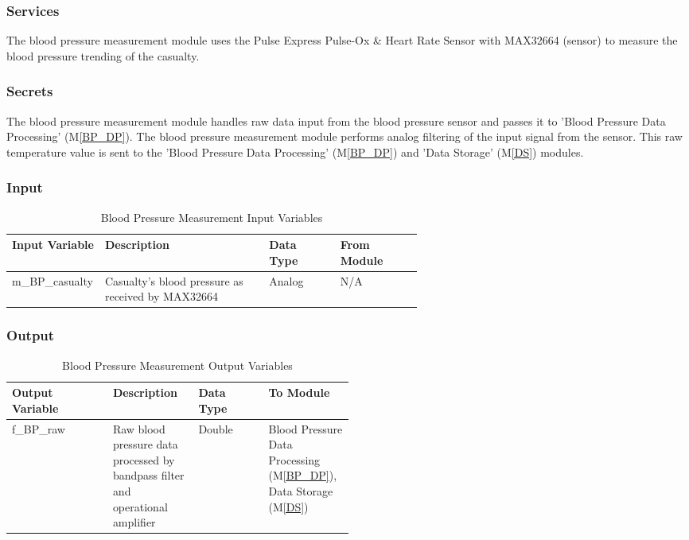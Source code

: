 \documentclass{article}
\begin{document}
\begin{description}
        \subsubsection{Services}
        The blood pressure measurement module uses the Pulse Express Pulse-Ox \& Heart Rate Sensor with MAX32664 (sensor) to measure the blood pressure trending of the casualty.
        \subsubsection{Secrets}
        The blood pressure measurement module handles raw data input from the blood pressure sensor and passes it to 'Blood Pressure Data Processing' (M\ref{BP_DP}). The blood pressure measurement module performs analog filtering of the input signal from the sensor. This raw temperature value is sent to the 'Blood Pressure Data Processing' (M\ref{BP_DP}) and 'Data Storage' (M\ref{DS}) modules.
        \subsubsection{Input}
            \begin{longtable}{|l|p{0.4\linewidth}|l|p{0.2\linewidth}|}
            \caption{Blood Pressure Measurement Input Variables}
            \hline
            \textbf{Input Variable} & \textbf{Description} & \textbf {Data Type} & \textbf{From Module} \\
            \endhead
            \hline
            m\_BP\_casualty & Casualty's blood pressure as received by MAX32664 & Analog & N/A \\
            \hline
            \end{longtable}
        \newpage
        \subsubsection{Output}
            \begin{longtable}{|l|p{0.25\linewidth}|l|p{0.25\linewidth}|}
            \caption{Blood Pressure Measurement Output Variables}
            \hline
            \textbf{Output Variable} & \textbf{Description} & \textbf {Data Type} & \textbf{To Module} \\
            \endhead
            \hline
            f\_BP\_raw & Raw blood pressure data processed by bandpass filter and operational amplifier & Double & Blood Pressure Data Processing (M\ref{BP_DP}), Data Storage (M\ref{DS}) \\
            \hline
            \end{longtable}

\end{description}
\end{document}
